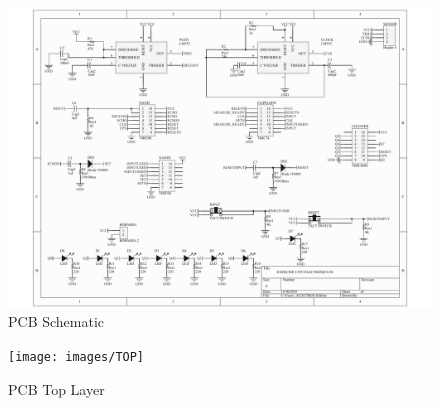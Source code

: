 \begin{figure}[H]
\begin{centering}
\includegraphics[scale=0.6]{Schematic}
\par\end{centering}
\caption{PCB Schematic}

\end{figure}

\begin{figure}[H]
\begin{centering}
\texttt{[image: images/TOP]}
\par\end{centering}
\caption{PCB Top Layer}

\end{figure}

